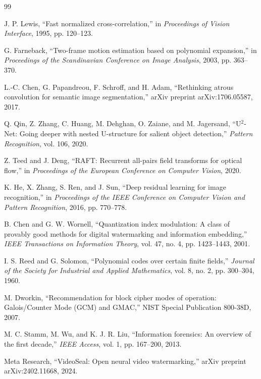 \documentclass[12pt,oneside]{report}
\begin{document}
\clearpage
\begingroup
\singlespacing
\begin{thebibliography}{99}

J. P. Lewis, ``Fast normalized cross-correlation,'' in \textit{Proceedings of Vision Interface}, 1995, pp. 120--123.

G. Farneback, ``Two-frame motion estimation based on polynomial expansion,'' in \textit{Proceedings of the Scandinavian Conference on Image Analysis}, 2003, pp. 363--370.

L.-C. Chen, G. Papandreou, F. Schroff, and H. Adam, ``Rethinking atrous convolution for semantic image segmentation,'' arXiv preprint arXiv:1706.05587, 2017.

Q. Qin, Z. Zhang, C. Huang, M. Dehghan, O. Zaiane, and M. Jagersand, ``U$^2$-Net: Going deeper with nested U-structure for salient object detection,'' \textit{Pattern Recognition}, vol. 106, 2020.

Z. Teed and J. Deng, ``RAFT: Recurrent all-pairs field transforms for optical flow,'' in \textit{Proceedings of the European Conference on Computer Vision}, 2020.

K. He, X. Zhang, S. Ren, and J. Sun, ``Deep residual learning for image recognition,'' in \textit{Proceedings of the IEEE Conference on Computer Vision and Pattern Recognition}, 2016, pp. 770--778.

B. Chen and G. W. Wornell, ``Quantization index modulation: A class of provably good methods for digital watermarking and information embedding,'' \textit{IEEE Transactions on Information Theory}, vol. 47, no. 4, pp. 1423--1443, 2001.

I. S. Reed and G. Solomon, ``Polynomial codes over certain finite fields,'' \textit{Journal of the Society for Industrial and Applied Mathematics}, vol. 8, no. 2, pp. 300--304, 1960.

M. Dworkin, ``Recommendation for block cipher modes of operation: Galois/Counter Mode (GCM) and GMAC,'' NIST Special Publication 800-38D, 2007.

M. C. Stamm, M. Wu, and K. J. R. Liu, ``Information forensics: An overview of the first decade,'' \textit{IEEE Access}, vol. 1, pp. 167--200, 2013.

Meta Research, ``VideoSeal: Open neural video watermarking,'' arXiv preprint arXiv:2402.11668, 2024.


\end{thebibliography}
\end{document}

